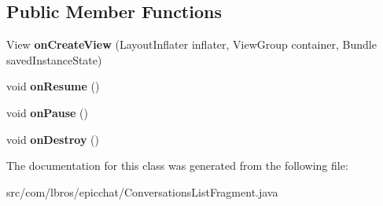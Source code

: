 \subsection*{Public Member Functions}
\begin{DoxyCompactItemize}
\item 
\hypertarget{classcom_1_1lbros_1_1epicchat_1_1_conversations_list_fragment_aff0d4327cbc8e273a267ff808efe827b}{View {\bfseries on\-Create\-View} (Layout\-Inflater inflater, View\-Group container, Bundle saved\-Instance\-State)}\label{classcom_1_1lbros_1_1epicchat_1_1_conversations_list_fragment_aff0d4327cbc8e273a267ff808efe827b}

\item 
\hypertarget{classcom_1_1lbros_1_1epicchat_1_1_conversations_list_fragment_ae1c2e517c2dd1ed12039bc7e68608d91}{void {\bfseries on\-Resume} ()}\label{classcom_1_1lbros_1_1epicchat_1_1_conversations_list_fragment_ae1c2e517c2dd1ed12039bc7e68608d91}

\item 
\hypertarget{classcom_1_1lbros_1_1epicchat_1_1_conversations_list_fragment_ab6ec1a58e222149c588c19416d7f96d5}{void {\bfseries on\-Pause} ()}\label{classcom_1_1lbros_1_1epicchat_1_1_conversations_list_fragment_ab6ec1a58e222149c588c19416d7f96d5}

\item 
\hypertarget{classcom_1_1lbros_1_1epicchat_1_1_conversations_list_fragment_ad40ab676aca4acd9fd083054fe7bfc23}{void {\bfseries on\-Destroy} ()}\label{classcom_1_1lbros_1_1epicchat_1_1_conversations_list_fragment_ad40ab676aca4acd9fd083054fe7bfc23}

\end{DoxyCompactItemize}


The documentation for this class was generated from the following file\-:\begin{DoxyCompactItemize}
\item 
src/com/lbros/epicchat/Conversations\-List\-Fragment.\-java\end{DoxyCompactItemize}
